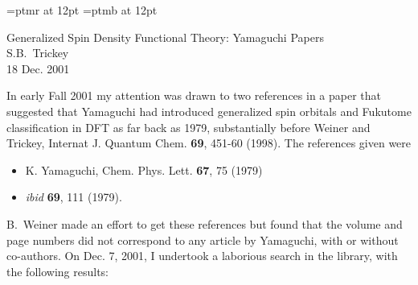 

    
\topmargin -1.7cm
    \oddsidemargin -0.05cm 
    \evensidemargin -0.05cm
    \textheight 23.6cm 
    \textwidth 16.5cm 
    \sloppy
    
\def\newline{\hfil\break}
    \font\tr=ptmr at 12pt 
    \font\trb=ptmb at 12pt
    





\thispagestyle{empty} \tr %
\noindent

\begin{center}
{\sc Generalized Spin Density Functional Theory: Yamaguchi Papers}\\[0pt]
\vspace{0.3cm}  S.B.~Trickey \\[0pt]
\vspace{0.3cm}  18 Dec. 2001 \\[0pt]
\vspace{0.6cm}
\end{center}

In early Fall 2001 my attention was drawn to two references in a paper  that
suggested that Yamaguchi had introduced generalized spin orbitals  and
Fukutome classification in DFT as far back as 1979, substantially  before
Weiner and Trickey, Internat J. Quantum Chem. {\bf 69}, 451-60 (1998).  The
references given were  \vspace{-0.2cm}

\begin{itemize}
\item K. Yamaguchi, Chem. Phys. Lett. {\bf 67}, 75 (1979)

\item {\em ibid} {\bf 69}, 111 (1979).
\end{itemize}

B.~Weiner made an effort to get these references but found that the  volume
and page numbers did not correspond to any article by Yamaguchi,  with or
without co-authors. On Dec. 7, 2001, I undertook a laborious  search in the
library, with the following results:

